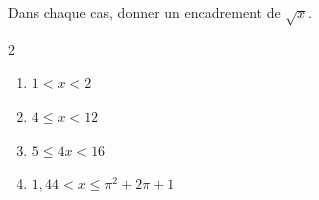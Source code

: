 \begin{exo}{}
	Dans chaque cas, donner un encadrement de $\sqrt{x}$.
	\vspace*{-2mm}
	\begin{multicols}{2}
		\begin{enumerate}[itemsep=2mm]
			\item $1 < x < 2$
			\item $4 \le x < 12$
			\item $5 \le 4x < 16$
			\item $1,44 < x \le \pi^2 + 2\pi + 1$
		\end{enumerate}
	\end{multicols}\vspace*{-2mm}
\end{exo}

